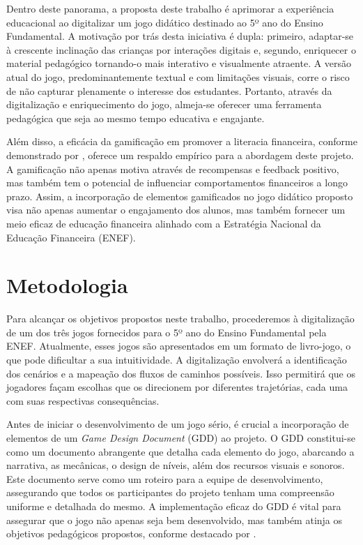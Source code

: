 Dentro deste panorama, a proposta deste trabalho é aprimorar a experiência educacional ao digitalizar um jogo didático destinado ao 5º ano do Ensino Fundamental. A motivação por trás desta iniciativa é dupla: primeiro, adaptar-se à crescente inclinação das crianças por interações digitais e, segundo, enriquecer o material pedagógico tornando-o mais interativo e visualmente atraente. A versão atual do jogo, predominantemente textual e com limitações visuais, corre o risco de não capturar plenamente o interesse dos estudantes. Portanto, através da digitalização e enriquecimento do jogo, almeja-se oferecer uma ferramenta pedagógica que seja ao mesmo tempo educativa e engajante.

Além disso, a eficácia da gamificação em promover a literacia financeira, conforme demonstrado por \cite{inchamnan2019gamification}, oferece um respaldo empírico para a abordagem deste projeto. A gamificação não apenas motiva através de recompensas e feedback positivo, mas também tem o potencial de influenciar comportamentos financeiros a longo prazo. Assim, a incorporação de elementos gamificados no jogo didático proposto visa não apenas aumentar o engajamento dos alunos, mas também fornecer um meio eficaz de educação financeira alinhado com a Estratégia Nacional da Educação Financeira (ENEF).


\section{Metodologia}

Para alcançar os objetivos propostos neste trabalho, procederemos à digitalização de um dos três jogos fornecidos para o 5º ano do Ensino Fundamental pela ENEF. Atualmente, esses jogos são apresentados em um formato de livro-jogo, o que pode dificultar a sua intuitividade. A digitalização envolverá a identificação dos cenários e a mapeação dos fluxos de caminhos possíveis. Isso permitirá que os jogadores façam escolhas que os direcionem por diferentes trajetórias, cada uma com suas respectivas consequências.

Antes de iniciar o desenvolvimento de um jogo sério, é crucial a incorporação de elementos de um \textit{Game Design Document} (GDD) ao projeto. O GDD constitui-se como um documento abrangente que detalha cada elemento do jogo, abarcando a narrativa, as mecânicas, o design de níveis, além dos recursos visuais e sonoros. Este documento serve como um roteiro para a equipe de desenvolvimento, assegurando que todos os participantes do projeto tenham uma compreensão uniforme e detalhada do mesmo. A implementação eficaz do GDD é vital para assegurar que o jogo não apenas seja bem desenvolvido, mas também atinja os objetivos pedagógicos propostos, conforme destacado por \cite{arifudin2022gdd}.


